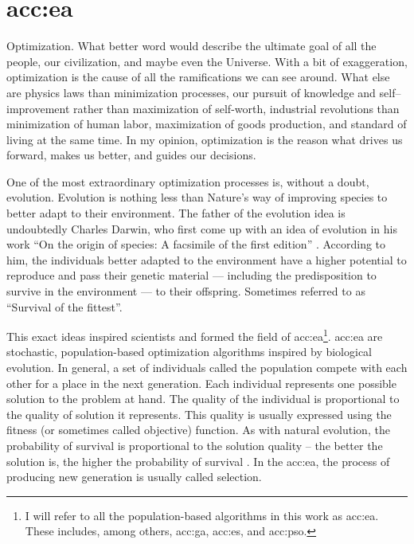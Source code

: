 \chapter{\texorpdfstring{\acrlong*{acc:ea}}{Evolutionary algorithms}}
\label{chap:eva}

Optimization. What better word would describe the ultimate goal of all the people, our civilization, and maybe even the Universe. With a bit of exaggeration, optimization is the cause of all the ramifications we can see around. What else are physics laws than minimization processes, our pursuit of knowledge and self--improvement rather than maximization of self-worth, industrial revolutions than minimization of human labor, maximization of goods production, and standard of living at the same time. In my opinion, optimization is the reason what drives us forward, makes us better, and guides our decisions.

One of the most extraordinary optimization processes is, without a doubt, evolution. Evolution is nothing less than Nature's way of improving species to better adapt to their environment. The father of the evolution idea is undoubtedly Charles Darwin, who first come up with an idea of evolution in his work \enquote{On the origin of species: A facsimile of the first edition} \citep{darwinOriginal}. According to him, the individuals better adapted to the environment have a higher potential to reproduce and pass their genetic material --- including the predisposition to survive in the environment --- to their offspring. Sometimes referred to as \enquote{Survival of the fittest}.

This exact ideas inspired scientists and formed the field of \acrfull{acc:ea}\footnote{I will refer to all the population-based algorithms in this work as \acrlong*{acc:ea}. These includes, among others, \acrlong*{acc:ga}, \acrlong*{acc:es}, and \acrlong*{acc:pso}.}.
\acrshort{acc:ea} are stochastic, population-based optimization algorithms inspired by biological evolution. In general, a set of individuals called the population compete with each other for a place in the next generation. Each individual represents one possible solution to the problem at hand. The quality of the individual is proportional to the quality of solution it represents. This quality is usually expressed using the fitness (or sometimes called objective) function. As with natural evolution, the probability of survival is proportional to the solution quality -- the better the solution is, the higher the probability of survival \citep{IntroductionToEA}. In the \acrshort{acc:ea}, the process of producing new generation is usually called selection.


